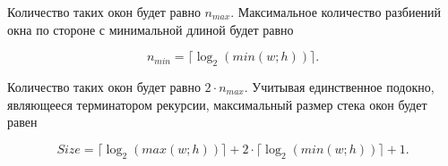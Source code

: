 Количество таких окон будет равно $n_{max}$. Максимальное количество разбиений окна по стороне с минимальной длиной будет равно

\begin{equation}
	\label{eq:n_min}
	n_{min} = \lceil\log_{2} (min(w; h))\rceil.
\end{equation}

Количество таких окон будет равно $2 \cdot n_{max}$. Учитывая единственное подокно, являющееся терминатором рекурсии, максимальный размер стека окон будет равен

\begin{equation}
	\label{eq:res}
	Size = \lceil\log_{2} (max(w; h))\rceil + 2 \cdot \lceil\log_{2} (min(w; h))\rceil + 1.
\end{equation}

